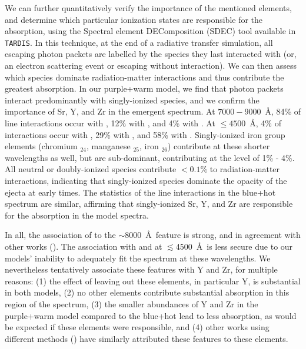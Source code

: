\documentclass[twocolumn, twocolappendix]{aastex63}
\def\TARDIS{\texttt{TARDIS}}
\begin{document}
We can further quantitatively verify the importance of the mentioned elements, and determine which particular ionization states are responsible for the absorption, using the Spectral element DEComposition (SDEC) tool available in \TARDIS. In this technique, at the end of a radiative transfer simulation, all escaping photon packets are labelled by the species they last interacted with (or, an electron scattering event or escaping without interaction). We can then assess which species dominate radiation-matter interactions and thus contribute the greatest absorption. In our purple+warm model, we find that photon packets interact predominantly with singly-ionized species, and we confirm the importance of Sr, Y, and Zr in the emergent spectrum. At $7000 - 9000$~\AA, 84\% of line interactions occur with , 12\% with , and 4\% with . At $\leqslant 4500$~\AA, 4\% of interactions occur with , 29\% with , and 58\% with . Singly-ionized iron group elements (chromium ${}_{24}$, manganese ${}_{25}$, iron ${}_{26}$) contribute at these shorter wavelengths as well, but are sub-dominant, contributing at the level of 1\% - 4\%. All neutral or doubly-ionized species contribute $< 0.1\%$ to radiation-matter interactions, indicating that singly-ionized species dominate the opacity of the ejecta at early times. The statistics of the line interactions in the blue+hot spectrum are similar, affirming that singly-ionized Sr, Y, and Zr are responsible for the absorption in the model spectra.

In all, the association of  to the $\sim$8000~\AA~feature is strong, and in agreement with other works (\citealt{watson19,domoto21,gillanders22,domoto22}). The association with  and  at $\lesssim$4500~\AA~is less secure due to our models' inability to adequately fit the spectrum at these wavelengths. We nevertheless tentatively associate these features with Y and Zr, for multiple reasons: (1) the effect of leaving out these elements, in particular Y, is substantial in both models, (2) no other elements contribute substantial absorption in this region of the spectrum, (3) the smaller abundances of Y and Zr in the purple+warm model compared to the blue+hot lead to less absorption, as would be expected if these elements were responsible, and (4) other works using different methods (\citealt{gillanders22, domoto22}) have similarly attributed these features to these elements. 
\end{document}
